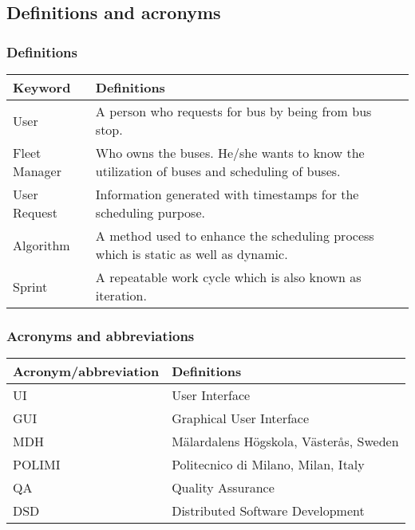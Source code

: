 \subsection{Definitions and acronyms}
\subsubsection{Definitions}
\begin{center}
	\begin{tabular} { | m{3cm} | m{10cm} | }
		\hline
		\textbf{Keyword} & \textbf{Definitions}\\
		\hline
		User & A person who requests for bus by being from bus stop.\\
		\hline
		Fleet Manager & Who owns the buses. He/she wants to know the utilization of buses and scheduling of buses.\\
		\hline
		User Request & Information generated with timestamps for the scheduling purpose.\\
		\hline
		Algorithm & A method used to enhance the scheduling process which is static as well as dynamic.\\
		\hline
		Sprint & A repeatable work cycle which is also known as iteration.\\
		\hline
	\end{tabular}
\end{center}
\subsubsection{Acronyms and abbreviations}
\begin{center}
	\begin{tabular} { | m{5cm} | m{8cm} | }
		\hline
		\textbf{Acronym/abbreviation} & \textbf{Definitions}\\
		\hline
		UI & User Interface\\
		\hline
		GUI & Graphical User Interface\\
		\hline
		MDH & M\"{a}lardalens H\"{o}gskola, V\"{a}ster\r{a}s, Sweden\\
		\hline
		POLIMI & Politecnico di Milano, Milan, Italy\\
		\hline
		QA & Quality Assurance\\
		\hline
		DSD & Distributed Software Development\\
		\hline
	\end{tabular}
\end{center}